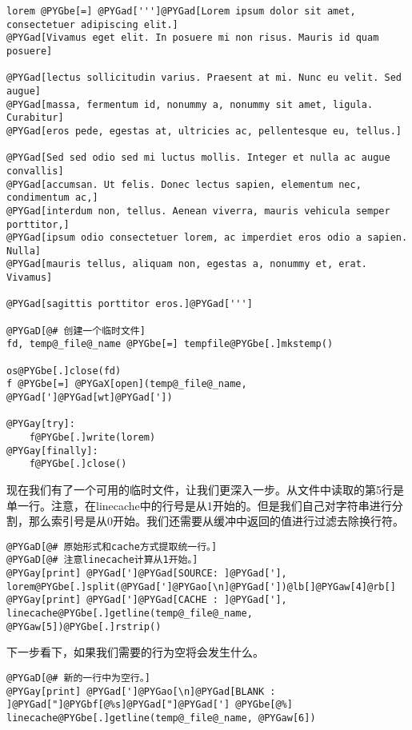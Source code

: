 \documentclass[a4paper,10pt,english]{manual}
\begin{document}
\begin{Verbatim}[commandchars=@\[\]]
lorem @PYGbe[=] @PYGad[''']@PYGad[Lorem ipsum dolor sit amet, consectetuer adipiscing elit.]
@PYGad[Vivamus eget elit. In posuere mi non risus. Mauris id quam posuere]

@PYGad[lectus sollicitudin varius. Praesent at mi. Nunc eu velit. Sed augue]
@PYGad[massa, fermentum id, nonummy a, nonummy sit amet, ligula. Curabitur]
@PYGad[eros pede, egestas at, ultricies ac, pellentesque eu, tellus.]

@PYGad[Sed sed odio sed mi luctus mollis. Integer et nulla ac augue convallis]
@PYGad[accumsan. Ut felis. Donec lectus sapien, elementum nec, condimentum ac,]
@PYGad[interdum non, tellus. Aenean viverra, mauris vehicula semper porttitor,]
@PYGad[ipsum odio consectetuer lorem, ac imperdiet eros odio a sapien. Nulla]
@PYGad[mauris tellus, aliquam non, egestas a, nonummy et, erat. Vivamus]

@PYGad[sagittis porttitor eros.]@PYGad[''']

@PYGaD[@# 创建一个临时文件]
fd, temp@_file@_name @PYGbe[=] tempfile@PYGbe[.]mkstemp()

os@PYGbe[.]close(fd)
f @PYGbe[=] @PYGaX[open](temp@_file@_name, @PYGad[']@PYGad[wt]@PYGad['])

@PYGay[try]:
    f@PYGbe[.]write(lorem)
@PYGay[finally]:
    f@PYGbe[.]close()
\end{Verbatim}

现在我们有了一个可用的临时文件，让我们更深入一步。从文件中读取的第5行是单一行。注意，在linecache中的行号是从1开始的。但是我们自己对字符串进行分割，那么索引号是从0开始。我们还需要从缓冲中返回的值进行过滤去除换行符。

\begin{Verbatim}[commandchars=@\[\]]
@PYGaD[@# 原始形式和cache方式提取统一行。]
@PYGaD[@# 注意linecache计算从1开始。]
@PYGay[print] @PYGad[']@PYGad[SOURCE: ]@PYGad['], lorem@PYGbe[.]split(@PYGad[']@PYGao[\n]@PYGad['])@lb[]@PYGaw[4]@rb[]
@PYGay[print] @PYGad[']@PYGad[CACHE : ]@PYGad['], linecache@PYGbe[.]getline(temp@_file@_name, @PYGaw[5])@PYGbe[.]rstrip()
\end{Verbatim}

下一步看下，如果我们需要的行为空将会发生什么。

\begin{Verbatim}[commandchars=@\[\]]
@PYGaD[@# 新的一行中为空行。]
@PYGay[print] @PYGad[']@PYGao[\n]@PYGad[BLANK : ]@PYGad["]@PYGbf[@%s]@PYGad["]@PYGad['] @PYGbe[@%] linecache@PYGbe[.]getline(temp@_file@_name, @PYGaw[6])
\end{Verbatim}
\end{document}
